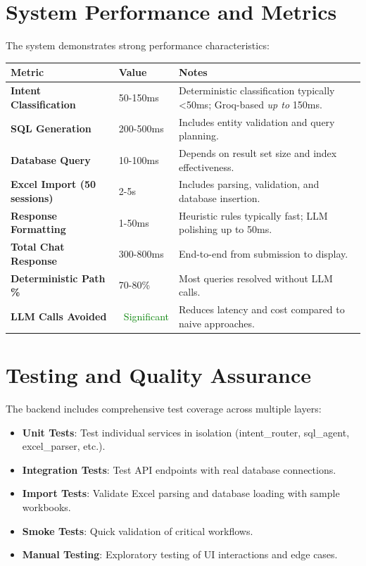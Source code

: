 \begin{fig}[H]
\section{System Performance and Metrics}

The system demonstrates strong performance characteristics:

\begin{center}
\begin{tabular}{|p{4cm}|p{2cm}|p{8cm}|}
\hline
\textbf{Metric} & \textbf{Value} & \textbf{Notes} \\
\hline
\textbf{Intent Classification} & 50-150ms & Deterministic classification typically \textless 50ms; Groq-based \textit{up to} 150ms. \\
\hline
\textbf{SQL Generation} & 200-500ms & Includes entity validation and query planning. \\
\hline
\textbf{Database Query} & 10-100ms & Depends on result set size and index effectiveness. \\
\hline
\textbf{Excel Import (50 sessions)} & 2-5s & Includes parsing, validation, and database insertion. \\
\hline
\textbf{Response Formatting} & 1-50ms & Heuristic rules typically fast; LLM polishing up to 50ms. \\
\hline
\textbf{Total Chat Response} & 300-800ms & End-to-end from submission to display. \\
\hline
\textbf{Deterministic Path \%} & 70-80\% & Most queries resolved without LLM calls. \\
\hline
\textbf{LLM Calls Avoided} & \textcolor{green}{~Significant} & Reduces latency and cost compared to naive approaches. \\
\hline
\end{tabular}
\end{center}

\section{Testing and Quality Assurance}

The backend includes comprehensive test coverage across multiple layers:

\begin{itemize}
    \item \textbf{Unit Tests}: Test individual services in isolation (intent\_router, sql\_agent, excel\_parser, etc.).
    \item \textbf{Integration Tests}: Test API endpoints with real database connections.
    \item \textbf{Import Tests}: Validate Excel parsing and database loading with sample workbooks.
    \item \textbf{Smoke Tests}: Quick validation of critical workflows.
    \item \textbf{Manual Testing}: Exploratory testing of UI interactions and edge cases.
\end{itemize}


\end{fig}
